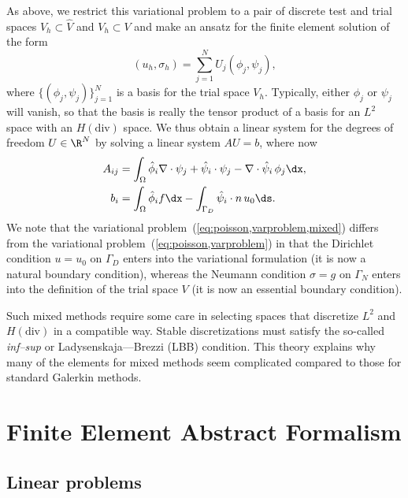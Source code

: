 As above, we restrict this variational problem to a pair of discrete
test and trial spaces $\hat{V}_h \subset \hat{V}$ and $V_h \subset V$
and make an ansatz for the finite element solution of the form
\begin{displaymath}
  (u_h, \sigma_h) = \sum_{j=1}^N U_j (\phi_j, \psi_j),
\end{displaymath}
where $\{(\phi_j, \psi_j)\}_{j=1}^N$ is a basis for the trial space
$V_h$. Typically, either \( \phi_j \) or \( \psi_j \) will vanish, so
that the basis is really the tensor product of a basis for an \( L^2
\) space with an \( H(\mathrm{div}) \) space.  We thus obtain a linear
system for the degrees of freedom $U \in \R^N$ by solving a linear
system $A U = b$, where now
\begin{displaymath}
  \begin{split}
    A_{ij} &=
    \int_{\Omega} \hat{\phi}_i \nabla \cdot \psi_j
    + \hat{\psi}_i \cdot \psi_j
    - \nabla \cdot \hat{\psi}_i \, \phi_j \dx, \\
    b_i &=
    \int_{\Omega} \hat{\phi}_i f \dx
    - \int_{\Gamma_D} \hat{\psi}_i \cdot n \, u_0 \ds.
  \end{split}
\end{displaymath}
We note that the variational
problem~(\ref{eq:poisson,varproblem,mixed}) differs from the
variational problem~(\ref{eq:poisson,varproblem}) in that the
Dirichlet condition $u = u_0$ on $\Gamma_D$ enters into the
variational formulation (it is now a natural boundary condition),
whereas the Neumann condition $\sigma = g$ on $\Gamma_N$ enters into
the definition of the trial space $V$ (it is now an essential boundary
condition).

Such mixed methods require some care in selecting spaces that
discretize \( L^2 \) and \( H(\mathrm{div}) \) in a compatible way.
Stable discretizations must satisfy the so-called \emph{inf--sup} or
Ladysenskaja--\babuska{}--Brezzi (LBB) condition. This theory explains
why many of the elements for mixed methods seem complicated compared
to those for standard Galerkin methods.

\section{Finite Element Abstract Formalism}
\label{sec:abstract}

\subsection{Linear problems}
\label{sec:abstract,linear}

